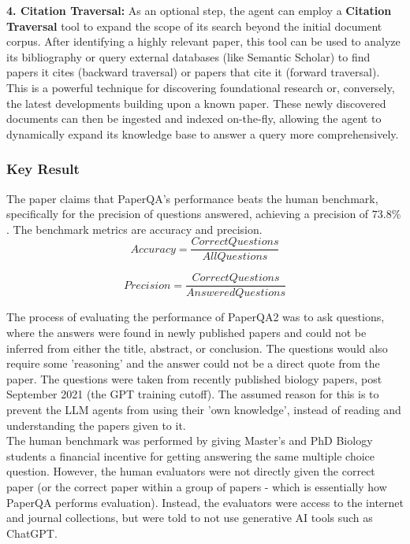 \textbf{4. Citation Traversal:}
As an optional step, the agent can employ a \textbf{Citation Traversal} tool to expand the scope of its search beyond the initial document corpus. After identifying a highly relevant paper, this tool can be used to analyze its bibliography or query external databases (like Semantic Scholar) to find papers it cites (backward traversal) or papers that cite it (forward traversal). This is a powerful technique for discovering foundational research or, conversely, the latest developments building upon a known paper. These newly discovered documents can then be ingested and indexed on-the-fly, allowing the agent to dynamically expand its knowledge base to answer a query more comprehensively.

\subsubsection{Key Result}
The paper claims that PaperQA's performance beats the human benchmark, specifically for the precision of questions answered, achieving a precision of $73.8\%$. The benchmark metrics are accuracy and precision. \\

\begin{equation}
    Accuracy = \frac{Correct Questions}{All Questions}
\end{equation}


\begin{equation}
    Precision = \frac{Correct Questions}{Answered Questions}
\end{equation}

The process of evaluating the performance of PaperQA2 was to ask questions, where the answers were found in newly published papers and could not be inferred from either the title, abstract, or conclusion.
The questions would also require some 'reasoning' and the answer could not be a direct quote from the paper.  
The questions were taken from recently published biology papers, post September 2021 (the GPT training cutoff). The assumed reason for this is to prevent the LLM agents from using their 'own knowledge', instead of reading and understanding the papers given to it. \\

The human benchmark was performed by giving Master's and PhD Biology students a financial incentive for getting answering the same multiple choice question. 
However, the human evaluators were not directly given the correct paper (or the correct paper within a group of papers - which is essentially how PaperQA performs evaluation). 
Instead, the evaluators were access to the internet and journal collections, but were told to not use generative AI tools such as ChatGPT. 

